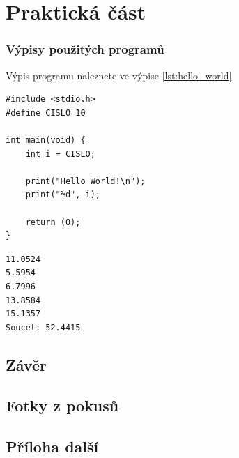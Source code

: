 \documentclass[12pt]{report}			%
\begin{document}
	\part{Praktická část}

\section{Výpisy použitých programů}

\lipsum[1]	

Výpis programu   naleznete ve výpise \ref{lst:hello_world}.

\begin{lstlisting}[title={Program hello.c}, caption={hello.c}, label={lst:hello_world}]
#include <stdio.h>
#define CISLO 10

int main(void) {
	int i = CISLO;

	print("Hello World!\n");
	print("%d", i);

	return (0);
}
\end{lstlisting}

\lipsum[1]	

\begin{lstlisting}[numbers=none, title={Příklad výstupního souboru}]
11.0524
5.5954
6.7996
13.8584
15.1357
Soucet: 52.4415
\end{lstlisting}

	\chapter*{Závěr}
	
		\lipsum[1]
	
	\nocite{*}
    \printbibliography					%
    \printglossary[title={Zkratky}]		%
    \listoffigures						%
    \listoftables						%

    \begin{appendices}
	\chapter{Fotky z pokusů}	
	\lipsum[1]
	\chapter{Příloha další }
	\end{appendices}
\end{document}

